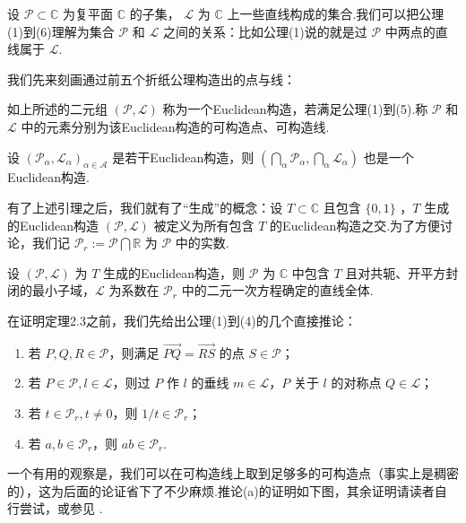 设 $\mathcal{P}\subset\mathbb{C}$ 为复平面 $\mathbb{C}$ 的子集， $\mathcal{L}$ 为 $\mathbb{C}$ 上一些直线构成的集合.我们可以把公理(1)到(6)理解为集合 $\mathcal{P}$ 和 $\mathcal{L}$ 之间的关系：比如公理(1)说的就是过 $\mathcal{P}$ 中两点的直线属于 $\mathcal{L}$.

我们先来刻画通过前五个折纸公理构造出的点与线：

\begin{definition}
    如上所述的二元组 $(\mathcal{P},\mathcal{L})$ 称为一个Euclidean构造，若满足公理(1)到(5).称 $\mathcal{P}$ 和 $\mathcal{L}$ 中的元素分别为该Euclidean构造的可构造点、可构造线.
\end{definition}

\begin{lemma}
    设 $(\mathcal{P}_\alpha,\mathcal{L}_\alpha)_{\alpha\in\mathcal{A}}$ 是若干Euclidean构造，则 $(\bigcap_\alpha \mathcal{P}_\alpha,\bigcap_\alpha \mathcal{L}_\alpha)$ 也是一个Euclidean构造.
\end{lemma}

有了上述引理之后，我们就有了“生成”的概念：设 $T\subset\mathbb{C}$ 且包含 $\{0,1\}$ ，$T$ 生成的Euclidean构造 $(\mathcal{P},\mathcal{L})$ 被定义为所有包含 $T$ 的Euclidean构造之交.为了方便讨论，我们记 $\mathcal{P}_r:=\mathcal{P}\bigcap\mathbb{R}$ 为 $\mathcal{P}$ 中的实数.

\begin{theorem}[Eulidean构造的刻画]
    设 $(\mathcal{P},\mathcal{L})$ 为 $T$ 生成的Euclidean构造，则 $\mathcal{P}$ 为 $\mathbb{C}$ 中包含 $T$ 且对共轭、开平方封闭的最小子域，$\mathcal{L}$ 为系数在 $\mathcal{P}_r$ 中的二元一次方程确定的直线全体.
\end{theorem}

在证明定理2.3之前，我们先给出公理(1)到(4)的几个直接推论：

\begin{enumerate}[wide,itemindent=2em,label=(\alph*)]
\item 若 $P,Q,R\in\mathcal{P}$，则满足 $\overrightarrow{PQ}=\overrightarrow{RS}$ 的点 $S\in\mathcal{P}$；
\item 若 $P\in\mathcal{P},l\in\mathcal{L}$，则过 $P$ 作 $l$ 的垂线 $m\in\mathcal{L}$，$P$ 关于 $l$ 的对称点 $Q\in\mathcal{L}$；
\item 若 $t\in\mathcal{P}_r,t\neq 0$，则 $1/t\in\mathcal{P}_r$；
\item 若 $a,b\in\mathcal{P}_r$，则 $ab\in\mathcal{P}_r$.
\end{enumerate}

一个有用的观察是，我们可以在可构造线上取到足够多的可构造点（事实上是稠密的），这为后面的论证省下了不少麻烦.推论(a)的证明如下图，其余证明请读者自行尝试，或参见 \cite{Hesi}.

